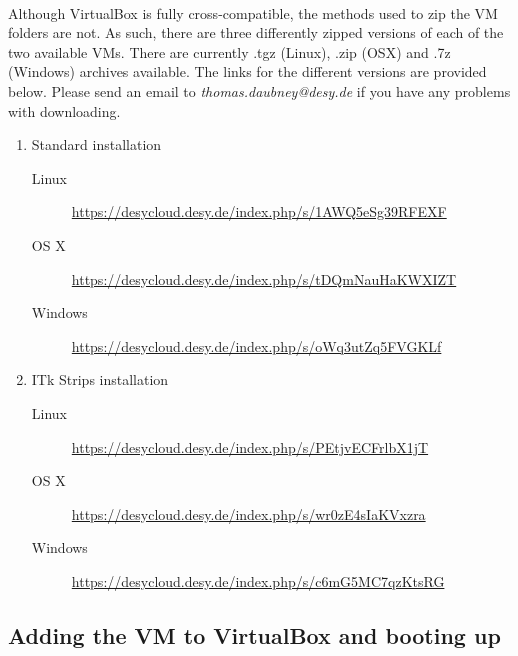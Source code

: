 \documentclass[11pt]{article}
\begin{document}
\paragraph{}
Although VirtualBox is fully cross-compatible, the methods used to zip the VM folders are not. As such, there are three differently zipped versions of each of the two available VMs. There are currently .tgz (Linux), .zip (OSX) and .7z (Windows) archives available. The links for the different versions are provided below. Please send an email to \textit{thomas.daubney@desy.de} if you have any problems with downloading.
\begin{enumerate}
\item Standard installation
\begin{description}
\item [Linux] \url{https://desycloud.desy.de/index.php/s/1AWQ5eSg39RFEXF}
\item [OS X] \url{https://desycloud.desy.de/index.php/s/tDQmNauHaKWXIZT}
\item [Windows] \url{https://desycloud.desy.de/index.php/s/oWq3utZq5FVGKLf}
\end{description}
\item ITk Strips installation
\begin{description}
\item [Linux] \url{https://desycloud.desy.de/index.php/s/PEtjvECFrlbX1jT}
\item [OS X] \url{https://desycloud.desy.de/index.php/s/wr0zE4sIaKVxzra}
\item [Windows] \url{https://desycloud.desy.de/index.php/s/c6mG5MC7qzKtsRG}
\end{description}
\end{enumerate}
\subsection{Adding the VM to VirtualBox and booting up}
\end{document}
